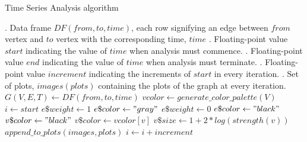 \documentclass[a4paper]{article}
\begin{document}
\begin{algorithm}
\caption{Time Series Analysis algorithm}\label{algo:tsa}

\begin{algorithmic}[1]
\INPUT
    . Data frame $DF(from, to, time)$, each row signifying an edge between $from$ vertex and $to$ vertex with the corresponding time, 
               $time$
    . Floating-point value $start$ indicating the value of $time$ when analysis must commence.
    . Floating-point value $end$ indicating the value of $time$ when analysis must terminate.
    . Floating-point value $increment$ indicating the increments of $start$ in every iteration.
\OUTPUT
    . Set of plots, $images(plots)$ containing the plots of the graph at every iteration.
\Statex
{}
    \State $G(V, E, T) \gets DF(from, to, time)$
    \State $vcolor \gets generate\_color\_palette(V)$
    \State $i \gets start$
                \State $e\$weight \gets 1$
                \State $e\$color \gets "gray"$
            \Else
                \State $e\$weight \gets 0$
                \State $e\$color \gets "black"$
            \EndIf \label{tsa_eendif}
                \State $v\$color \gets "black"$
            \Else
                \State $v\$color \gets vcolor[v]$ 
            \EndIf \label{tsa_strengthendif}
            \State $v\$size \gets 1 + 2 * log(strength(v))$
        \EndFor \label{tsa_eendfor}
        \State $append\_to\_plots(images, plots)$
        \State $i \gets i + increment$
    \EndWhile \label{tsa_iendwhile} 
\EndProcedure

\end{algorithmic}
\end{algorithm}
\end{document}
